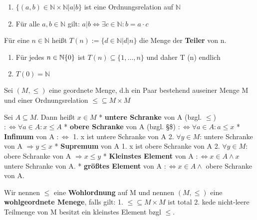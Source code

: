 \documentclass{../../meta/tudscript}
\begin{document}
\newcommand{\ilmath}[1]{\begin{flalign*}#1\end{flalign*}}


\label{bemerkung}

\begin{enumerate}
\def\labelenumi{\arabic{enumi}.}

\item
  \(\{(a,b) \in \mathbb{N}\times \mathbb{N}| a | b \}\) ist eine
  Ordnungsrelation auf \(\mathbb{N}\)
\item
  Für alle \(a,b \in \mathbb{N}\) gilt:
  \(a|b \iff \exists c \in \mathbb{N}: b = a \cdot c\)
\end{enumerate}


\label{definition-teiler-natuxfcrlicher-zahlen}

Für eine \(n \in \mathbb{N}\) heißt
\(T(n) := \{d \in \mathbb{N}| d|n\}\) die Menge der \textbf{Teiler} von
n.


\label{bemerkung-1}

\begin{enumerate}
\def\labelenumi{\arabic{enumi}.}

\item
  Für jedes \(n\in \mathbb{N}\\ \{0\}\) ist
  \(T(n) \subseteq \{1,\ldots,n\}\) und daher T (n) endlich
\item
  \(T(0) = \mathbb{N}\)
\end{enumerate}


\label{definition}

Sei \((M, \leq)\) eine geordnete Menge, d.h ein Paar bestehend auseiner
Menge M und einer Ordnungsrelation \(\leq \subseteq M \times M\)

Sei $A \subseteq M$. Dann heißt \(x \in M\) * \textbf{untere Schranke}
von A (bzgl. \(\leq\)) \(: \iff \forall a \in A: x \leq A\) *
\textbf{obere Schranke} von A (bzgl. §\leq\$)
\(: \iff \forall a \in A: a \leq x\) * \textbf{Infimum} von A \(: \iff\)
1. x ist untere Schranke von A 2. \(\forall y \in M\): untere Schranke
von A \(\Rightarrow y \leq x\) * \textbf{Supremum} von A 1. x ist obere
Schranke von A 2. \(\forall y \in M:\) obere Schranke von A
\(\Rightarrow x \leq y\) * \textbf{Kleinstes Element} von A
\(: \iff x \in A \land x\) untere Schranke von A. * \textbf{größtes
Element} von A \(: \iff x \in A \land\) obere Schranke von A.

Wir nennen \(\leq\) eine \textbf{Wohlordnung} auf M und nennen
\((M, \leq)\) eine \textbf{wohlgeordnete Menege}, falls gilt: 1.
\(\leq \subseteq M \times M\) ist total 2. kede nicht-leere Teilmenge
von M besitzt ein kleinstes Element bzgl \(\leq\).
\end{document}
